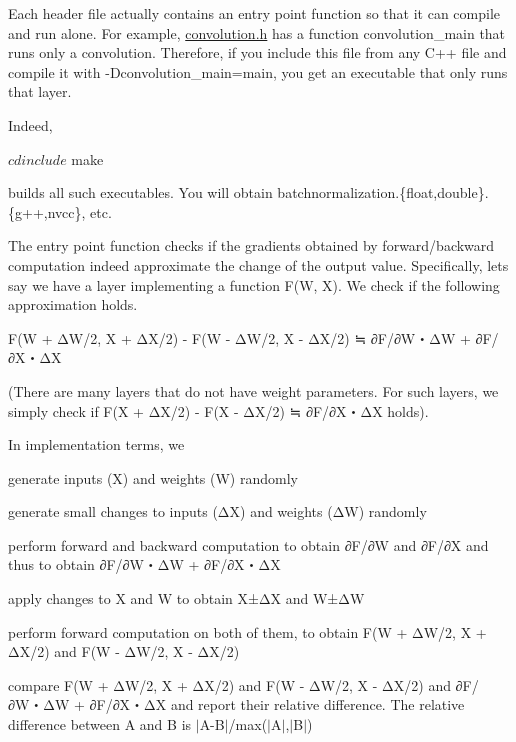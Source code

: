 Each header file actually contains an entry point function so that it can compile and run alone. For example, \hyperlink{convolution_8h}{convolution.\+h} has a function convolution\+\_\+main that runs only a convolution. Therefore, if you include this file from any C++ file and compile it with -\/\+Dconvolution\+\_\+main=main, you get an executable that only runs that layer.

Indeed,


\begin{DoxyCode}
$ cd include
$ make
\end{DoxyCode}


builds all such executables. You will obtain batchnormalization.\{float,double\}.\{g++,nvcc\}, etc.

The entry point function checks if the gradients obtained by forward/backward computation indeed approximate the change of the output value. Specifically, let\textquotesingle{}s say we have a layer implementing a function F(\+W, X). We check if the following approximation holds. \begin{DoxyVerb}F(W + ΔW/2, X + ΔX/2) - F(W - ΔW/2, X - ΔX/2) ≒ ∂F/∂W・ΔW + ∂F/∂X・ΔX
\end{DoxyVerb}


(There are many layers that do not have weight parameters. For such layers, we simply check if F(X + Δ\+X/2) -\/ F(X -\/ Δ\+X/2) ≒ ∂\+F/∂\+X・ΔX holds).

In implementation terms, we


\begin{DoxyItemize}
\item generate inputs (X) and weights (W) randomly
\item generate small changes to inputs (ΔX) and weights (ΔW) randomly
\item perform forward and backward computation to obtain ∂\+F/∂W and ∂\+F/∂X and thus to obtain ∂\+F/∂\+W・ΔW + ∂\+F/∂\+X・ΔX
\item apply changes to X and W to obtain X±ΔX and W±ΔW
\item perform forward computation on both of them, to obtain F(W + Δ\+W/2, X + Δ\+X/2) and F(W -\/ Δ\+W/2, X -\/ Δ\+X/2)
\item compare F(W + Δ\+W/2, X + Δ\+X/2) and F(W -\/ Δ\+W/2, X -\/ Δ\+X/2) and ∂\+F/∂\+W・ΔW + ∂\+F/∂\+X・ΔX and report their relative difference. The relative difference between A and B is $\vert$\+A-\/\+B$\vert$/max($\vert$\+A$\vert$,$\vert$\+B$\vert$)
\end{DoxyItemize}

